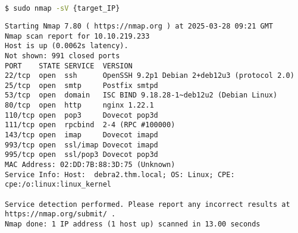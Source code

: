 \documentclass[11pt,a4paper]{article}
\newenvironment{commandbox}[1][]{
    \begin{tcolorbox}[
        colback=kalibackground,   
        colframe=commandcolor,    
        fonttitle=\bfseries\color{white},  
        title=#1,               
        breakable=true           
    ]
}{
    \end{tcolorbox}
}
\begin{document}
\clearpage

\begin{commandbox}[Service Version Detection for Comparison]
\begin{lstlisting}[language=bash, basicstyle=\small\ttfamily\color{warningcolor}]
$ sudo nmap -sV {target_IP}
\end{lstlisting}

\begin{lstlisting}[basicstyle=\small\ttfamily\color{kalitext}]
Starting Nmap 7.80 ( https://nmap.org ) at 2025-03-28 09:21 GMT
Nmap scan report for 10.10.219.233
Host is up (0.0062s latency).
Not shown: 991 closed ports
PORT    STATE SERVICE  VERSION
22/tcp  open  ssh      OpenSSH 9.2p1 Debian 2+deb12u3 (protocol 2.0)
25/tcp  open  smtp     Postfix smtpd
53/tcp  open  domain   ISC BIND 9.18.28-1~deb12u2 (Debian Linux)
80/tcp  open  http     nginx 1.22.1
110/tcp open  pop3     Dovecot pop3d
111/tcp open  rpcbind  2-4 (RPC #100000)
143/tcp open  imap     Dovecot imapd
993/tcp open  ssl/imap Dovecot imapd
995/tcp open  ssl/pop3 Dovecot pop3d
MAC Address: 02:DD:7B:88:3D:75 (Unknown)
Service Info: Host:  debra2.thm.local; OS: Linux; CPE: cpe:/o:linux:linux_kernel

Service detection performed. Please report any incorrect results at https://nmap.org/submit/ .
Nmap done: 1 IP address (1 host up) scanned in 13.00 seconds
\end{lstlisting}
\end{commandbox}
\end{document}
